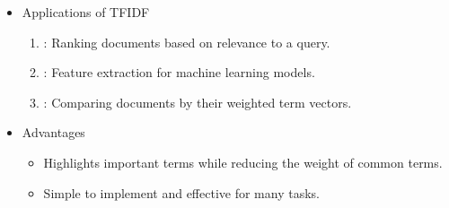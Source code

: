 \documentclass[letterpaper,11pt,english]{sphinxmanual}
\begin{document}
\begin{itemize}
\begin{quote}
\begin{sphinxadmonition}{note}{Fun Fact}
\begin{sphinxVerbatim}[commandchars=\\\{\}]
\PYG{p}{[}   \PYG{p}{]}
\PYG{p}{[}\PYG{p}{[}     \PYG{p}{]}
\PYG{p}{[}     \PYG{p}{]}
\PYG{p}{[}     \PYG{p}{]}\PYG{p}{]}
\PYG{p}{[}                             \PYG{p}{]}
\end{sphinxVerbatim}
\end{sphinxadmonition}
\end{quote}

\item {} 
\sphinxAtStartPar
Applications of TF\sphinxhyphen{}IDF
\begin{enumerate}
%
\item {} 
\sphinxAtStartPar
{}: Ranking documents based on relevance to a query.

\item {} 
\sphinxAtStartPar
{}: Feature extraction for machine learning models.

\item {} 
\sphinxAtStartPar
{}: Comparing documents by their weighted term vectors.

\end{enumerate}

\item {} 
\sphinxAtStartPar
Advantages
\begin{itemize}
\item {} 
\sphinxAtStartPar
Highlights important terms while reducing the weight of common terms.

\item {} 
\sphinxAtStartPar
Simple to implement and effective for many tasks.


\end{itemize}
\end{itemize}
\end{document}
